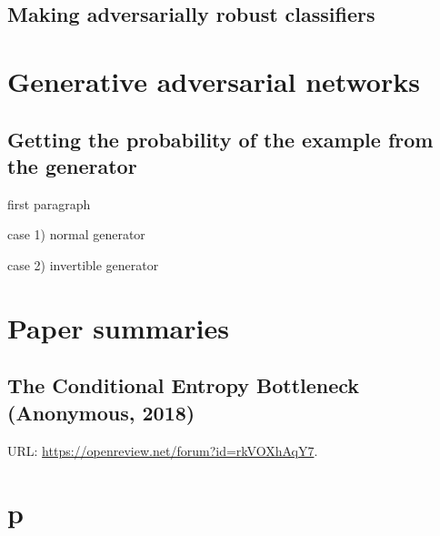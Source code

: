 \documentclass{article}
\begin{document}
\subsection{Making adversarially robust classifiers}



\section{Generative adversarial networks}

\subsection{Getting the probability of the example from the generator}

first paragraph

case 1) normal generator

case 2) invertible generator


\section{Paper summaries}

\subsection{The Conditional Entropy Bottleneck (Anonymous, 2018)}

URL: \url{https://openreview.net/forum?id=rkVOXhAqY7}.


\section{p}
\end{document}
